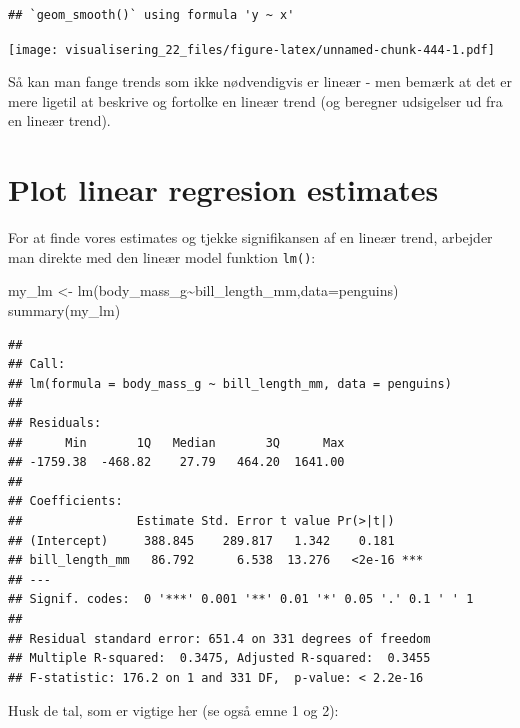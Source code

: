\documentclass[
]{book}
\newenvironment{Shaded}{\begin{snugshade}}{\end{snugshade}}
\newcommand{\AttributeTok}[1]{\textcolor[rgb]{0.77,0.63,0.00}{#1}}
\newcommand{\FunctionTok}[1]{\textcolor[rgb]{0.00,0.00,0.00}{#1}}
\newcommand{\NormalTok}[1]{#1}
\newcommand{\OtherTok}[1]{\textcolor[rgb]{0.56,0.35,0.01}{#1}}
\newcommand{\SpecialCharTok}[1]{\textcolor[rgb]{0.00,0.00,0.00}{#1}}
\begin{document}
\begin{verbatim}
## `geom_smooth()` using formula 'y ~ x'
\end{verbatim}

\texttt{[image: visualisering\_22\_files/figure-latex/unnamed-chunk-444-1.pdf]}

Så kan man fange trends som ikke nødvendigvis er lineær - men bemærk at det er mere ligetil at beskrive og fortolke en lineær trend (og beregner udsigelser ud fra en lineær trend).

\hypertarget{plot-linear-regresion-estimates}{%
\section{Plot linear regresion estimates}\label{plot-linear-regresion-estimates}}

For at finde vores estimates og tjekke signifikansen af en lineær trend, arbejder man direkte med den lineær model funktion \texttt{lm()}:

\begin{Shaded}
\begin{Highlighting}[]
\NormalTok{my\_lm }\OtherTok{\textless{}{-}} \FunctionTok{lm}\NormalTok{(body\_mass\_g}\SpecialCharTok{\textasciitilde{}}\NormalTok{bill\_length\_mm,}\AttributeTok{data=}\NormalTok{penguins)}
\FunctionTok{summary}\NormalTok{(my\_lm)}
\end{Highlighting}
\end{Shaded}

\begin{verbatim}
## 
## Call:
## lm(formula = body_mass_g ~ bill_length_mm, data = penguins)
## 
## Residuals:
##      Min       1Q   Median       3Q      Max 
## -1759.38  -468.82    27.79   464.20  1641.00 
## 
## Coefficients:
##                Estimate Std. Error t value Pr(>|t|)    
## (Intercept)     388.845    289.817   1.342    0.181    
## bill_length_mm   86.792      6.538  13.276   <2e-16 ***
## ---
## Signif. codes:  0 '***' 0.001 '**' 0.01 '*' 0.05 '.' 0.1 ' ' 1
## 
## Residual standard error: 651.4 on 331 degrees of freedom
## Multiple R-squared:  0.3475, Adjusted R-squared:  0.3455 
## F-statistic: 176.2 on 1 and 331 DF,  p-value: < 2.2e-16
\end{verbatim}

Husk de tal, som er vigtige her (se også emne 1 og 2):
\end{document}
